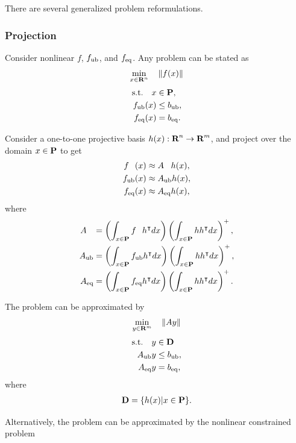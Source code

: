 \documentclass{article}
\begin{document}
There are several generalized problem reformulations.

\subsubsection{Projection}

    Consider nonlinear $f$, $f_{\text{ub}}$, and $f_{\text{eq}}$.  
    Any problem can be stated as
    \begin{align*}
        \min_{x\in\textbf{R}^n}\quad \|f(x)\|
    \end{align*}
    \begin{align*}
        \text{s.t.}\quad x&\in\textbf{P},\\
        f_{\text{ub}}(x)&\leq b_{\text{ub}},\\
        f_{\text{eq}}(x)&=b_{\text{eq}}.
    \end{align*}

    Consider a one-to-one projective basis $h(x):\textbf{R}^n\to\textbf{R}^m$, and project over the domain $x\in\textbf{P}$ to get
    \begin{align*}
        f_{\phantom{\eq}}(x) & \approx A_{\phantom{\eq}} h(x),\\
        f_\ub(x) & \approx A_\ub h(x),\\
        f_\eq(x) & \approx A_\eq h(x),
    \end{align*}
    where
    \begin{align*}
        A_{\phantom{\eq}}&=\left(\int_{x\in\poly} f_{\phantom{\eq}}h^\tp dx\right)\left(\int_{x\in\poly} hh^\tp dx\right)^+,\\
        A_\ub&=\left(\int_{x\in\poly} f_\ub h^\tp dx\right)\left(\int_{x\in\poly} hh^\tp dx\right)^+,\\
        A_\eq&=\left(\int_{x\in\poly} f_\eq h^\tp dx\right)\left(\int_{x\in\poly} hh^\tp dx\right)^+.
    \end{align*}

    The problem can be approximated by
    \begin{align*}
        \min_{y\in\textbf{R}^m}\quad \|Ay\|
    \end{align*}
    \begin{align*}
        \text{s.t.}\quad y&\in\textbf{D}\\
        A_{\text{ub}} y&\leq b_{\text{ub}},\\
        A_{\text{eq}} y&=b_{\text{eq}},
    \end{align*}
    where
    \begin{align*}
        \textbf{D} = \{h(x)|x\in\textbf{P}\}.
    \end{align*}

    Alternatively, 
    the problem can be approximated by the nonlinear constrained problem
\end{document}
